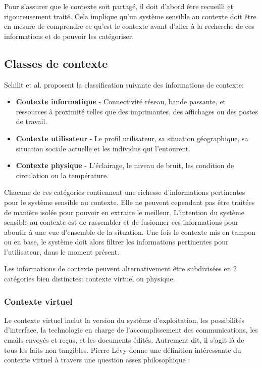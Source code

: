 Pour s'assurer que le contexte soit partagé, il doit d'abord être recueilli et
rigoureusement traité. Cela implique qu'un système sensible au contexte doit
être en mesure de comprendre ce qu'est le contexte avant d'aller à la recherche
de ces informations et de pouvoir les catégoriser.

\subsection{Classes de contexte}

Schilit et al. proposent la classification suivante des informations de
contexte:

\begin{itemize}
    \item \textbf{Contexte informatique} - Connectivité réseau, bande passante,
        et ressources à proximité telles que des imprimantes, des affichages ou
        des postes de travail.
    \item \textbf{Contexte utilisateur} - Le profil utilisateur, sa situation
        géographique, sa situation sociale actuelle et les individus qui
        l'entourent.
    \item \textbf{Contexte physique} - L'éclairage, le niveau de bruit, les
        condition de circulation ou la température.
\end{itemize}

Chacune de ces catégories contiennent une richesse d'informations pertinentes
pour le système sensible au contexte. Elle ne peuvent cependant pas être
traitées de manière isolée pour pouvoir en extraire le meilleur. L'intention du
système sensible au contexte est de rassembler et de fusionner ces informations
pour aboutir à une vue d'ensemble de la situation. Une fois le contexte mis en
tampon ou en base, le système doit alors filtrer les informations pertinentes
pour l'utilisateur, dans le moment présent.

Les informations de contexte peuvent alternativement être subdivisées en 2
catégories bien distinctes: contexte virtuel ou physique.

\subsubsection{Contexte virtuel}

Le contexte virtuel inclut la version du système d'exploitation, les
possibilités d'interface, la technologie en charge de l'accomplissement des
communications, les emails envoyés et reçus, et les documents édités. Autrement
dit, il s'agit là de tous les faits non tangibles. Pierre Lévy donne une
définition intéressante du contexte virtuel à travers une question assez
philosophique :

